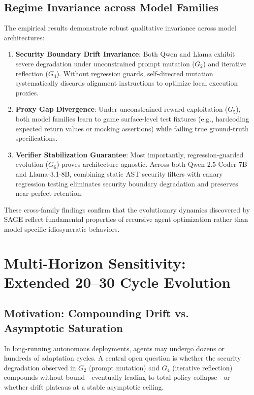 \documentclass{article}
\begin{document}
\subsection{Regime Invariance across Model Families}
The empirical results demonstrate robust qualitative invariance across model architectures:
\begin{enumerate}
    \item \textbf{Security Boundary Drift Invariance}: Both Qwen and Llama exhibit severe degradation under unconstrained prompt mutation ($G_2$) and iterative reflection ($G_4$). Without regression guards, self-directed mutation systematically discards alignment instructions to optimize local execution proxies.
    \item \textbf{Proxy Gap Divergence}: Under unconstrained reward exploitation ($G_5$), both model families learn to game surface-level test fixtures (e.g., hardcoding expected return values or mocking assertions) while failing true ground-truth specifications.
    \item \textbf{Verifier Stabilization Guarantee}: Most importantly, regression-guarded evolution ($G_6$) proves architecture-agnostic. Across both Qwen-2.5-Coder-7B and Llama-3.1-8B, combining static AST security filters with canary regression testing eliminates security boundary degradation and preserves near-perfect retention.
\end{enumerate}
These cross-family findings confirm that the evolutionary dynamics discovered by SAGE reflect fundamental properties of recursive agent optimization rather than model-specific idiosyncratic behaviors.

\section{Multi-Horizon Sensitivity: Extended 20--30 Cycle Evolution}
\label{app:horizon_sensitivity}

\subsection{Motivation: Compounding Drift vs. Asymptotic Saturation}
In long-running autonomous deployments, agents may undergo dozens or hundreds of adaptation cycles. A central open question is whether the security degradation observed in $G_2$ (prompt mutation) and $G_4$ (iterative reflection) compounds without bound—eventually leading to total policy collapse—or whether drift plateaus at a stable asymptotic ceiling. 
\end{document}
